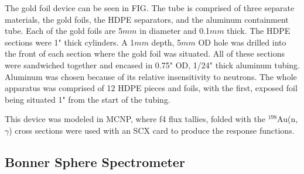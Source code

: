 The gold foil device can be seen in FIG.
The tube is comprised of three separate materials, the gold foils, the HDPE separators, and the aluminum containment tube.
Each of the gold foils are 5$mm$ in diameter and 0.1$mm$ thick.
The HDPE sections were 1" thick cylinders.
A 1$mm$ depth, 5$mm$ OD hole was drilled into the front of each section where the gold foil was situated.
All of these sections were sandwiched together and encased in 0.75" OD, 1/24" thick aluminum tubing.
Aluminum was chosen because of its relative insensitivity to neutrons.
The whole apparatus was comprised of 12 HDPE pieces and foils, with the first, exposed foil being situated 1" from the start of the tubing.

This device was modeled in MCNP, where f4 flux tallies, folded with the $^{198}$Au(n,$\gamma$) cross sections were used with an SCX card to produce the response functions.

\subsection{Bonner Sphere Spectrometer}


%






